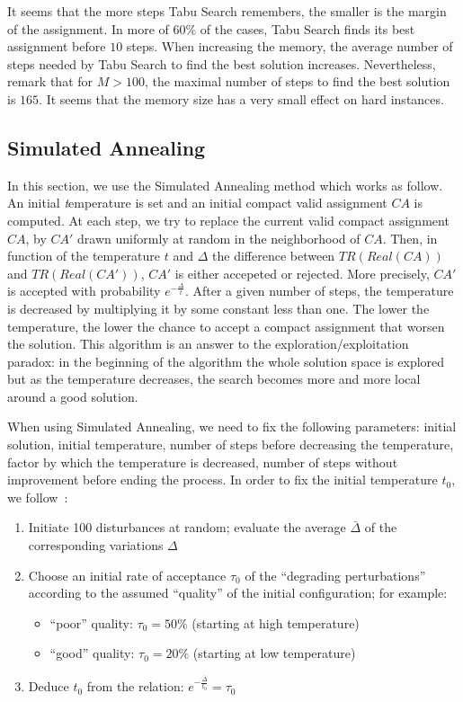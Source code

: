 It seems that the more steps Tabu Search remembers, the smaller is the margin of the assignment.
In more of $60\%$ of the cases, Tabu Search finds its best assignment before $10$ steps. When increasing the memory, the average number of steps needed by Tabu Search to find the best solution increases. Nevertheless, remark that for $M > 100$,
the maximal number of steps to find the best solution is $165$. It seems that the memory size has a very small effect on  hard instances.


\subsection{Simulated Annealing}\label{sec:recuit}



In this section, we use the Simulated Annealing method which works as follow.  An initial {\emph temperature} is set and an initial compact valid assignment $CA$ is computed. At each step, we try to replace the current valid compact assignment $CA$, by $CA'$ drawn uniformly at random in the neighborhood of $CA$. Then, in function of the temperature $t$ and $\Delta$ the difference between $TR(Real(CA))$ and $TR(Real(CA'))$, $CA'$ is either accepeted or rejected. More precisely, 
$CA'$ is accepted with probability $e^{-\frac{\Delta}{t}}$. 
After a given number of steps, the temperature is decreased by multiplying it by some constant less than one. The lower the temperature, the lower the chance to accept a compact assignment that worsen the solution. This algorithm is an answer to the exploration/exploitation paradox: in the beginning of the algorithm the whole solution space is explored but as the temperature decreases, the search becomes more and more local around a good solution.


 When using Simulated Annealing, we need to fix the following parameters: initial solution, initial temperature, number of steps before decreasing the temperature, factor by which the temperature is decreased, number of steps without improvement before ending the process. In order to fix the initial temperature $t_0$, we follow~\cite{osman1997meta}:
 \begin{enumerate}
  \item Initiate 100 disturbances at random; evaluate the average $\bar{\Delta}$ of the corresponding variations $\Delta$
\item Choose an initial rate of acceptance $\tau_0$ of the “degrading perturbations” according to the assumed “quality” of the initial configuration; for example:
\begin{itemize}
 \item “poor” quality: $\tau_0 = 50 \%$ (starting at high temperature)
\item “good” quality: $\tau_0 = 20 \%$ (starting at low temperature)
\end{itemize}
\item Deduce $t_0$ from the relation: $e^{-\frac{\bar{\Delta}}{t_0}} = \tau_0$ 
 \end{enumerate}
 
